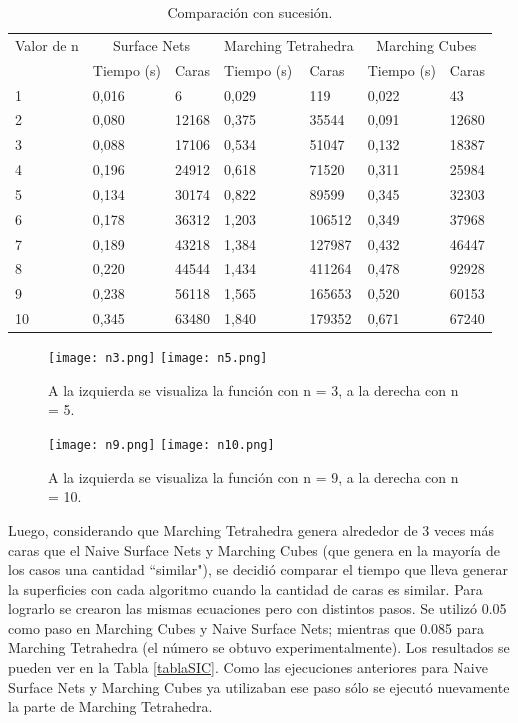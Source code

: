 \documentclass[12pt]{article}
\begin{document}
\begin{table}[h!]
  \centering
\begin{tabular}{lllllll}
\toprule 
    Valor de n & \multicolumn{2}{c}{Surface Nets} & \multicolumn{2}{c}{Marching Tetrahedra}  & \multicolumn{2}{c}{Marching Cubes}\\
    &Tiempo (s) &Caras
    &Tiempo (s) &Caras
    &Tiempo (s) &Caras \\
    \midrule
    1 & 0,016 &6 & 0,029 &119 & 0,022 &43\\
    2 & 0,080 &12168 & 0,375 &35544 & 0,091 &12680\\
    3 & 0,088 &17106 & 0,534 &51047 & 0,132 &18387\\
    4 & 0,196 &24912 & 0,618 &71520 & 0,311 &25984\\
    5 & 0,134 &30174 & 0,822 &89599 & 0,345 &32303\\
    6 & 0,178 &36312 & 1,203 &106512 & 0,349 &37968\\
    7 & 0,189 &43218 & 1,384 &127987 & 0,432 &46447\\
    8 & 0,220 &44544 & 1,434 &411264 & 0,478 &92928\\
    9 & 0,238 &56118 & 1,565 &165653 & 0,520 &60153\\
    10 & 0,345 &63480 & 1,840 &179352 & 0,671 &67240\\
    \bottomrule
\end{tabular}
  \caption{Comparación con sucesión.}
  \label{suc2}
\end{table}

\begin{figure}[h!]
\texttt{[image: n3.png]}
\hfill
\texttt{[image: n5.png]}
\caption{ A la izquierda se visualiza la función con n = 3, a la derecha con n = 5.}
\label{ejsuc1}
\end{figure}

\begin{figure}[h!]
\texttt{[image: n9.png]}
\hfill
\texttt{[image: n10.png]}
\caption{ A la izquierda se visualiza la función con n = 9, a la derecha con n = 10.}
\label{ejsuc2}
\end{figure}

Luego, considerando que Marching Tetrahedra genera alrededor de 3 veces más caras que el Naive Surface Nets y Marching Cubes (que genera en la mayoría de los casos una cantidad ``similar"), se decidió comparar el tiempo que lleva generar la superficies con cada algoritmo cuando la cantidad de caras es similar. Para lograrlo se crearon las mismas ecuaciones pero con distintos pasos. Se utilizó 0.05 como paso en Marching Cubes y Naive Surface Nets; mientras que 0.085 para Marching Tetrahedra (el número se obtuvo experimentalmente). Los resultados se pueden ver en la Tabla \ref{tablaSIC}. Como las ejecuciones anteriores para Naive Surface Nets y Marching Cubes ya utilizaban ese paso sólo se ejecutó nuevamente la parte de Marching Tetrahedra.
\end{document}
